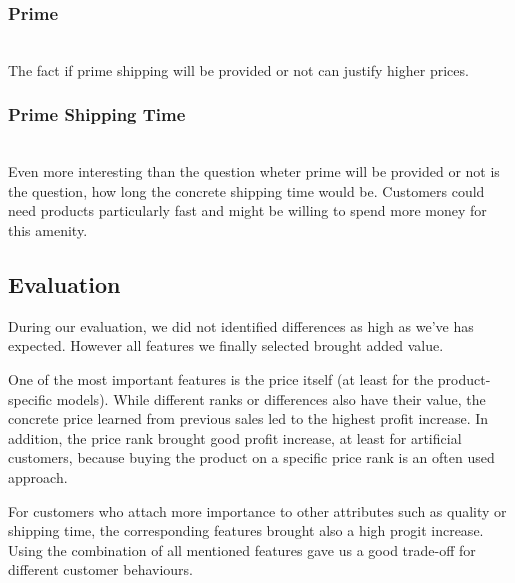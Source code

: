 	\subsubsection{Prime}
		~\\
		The fact if prime shipping will be provided or not can justify higher prices.
	\subsubsection{Prime Shipping Time}
		~\\
		Even more interesting than the question wheter prime will be provided or not is the question, how long the concrete shipping time would be. Customers could need products particularly fast and might be willing to spend more money for this amenity.
\subsection{Evaluation}
	During our evaluation, we did not identified differences as high as we've has expected. However all features we finally selected brought added value.

	One of the most important features is the price itself (at least for the product-specific models). While different ranks or differences also have their value, the concrete price learned from previous sales led to the highest profit increase. In addition, the price rank brought good profit increase, at least for artificial customers, because buying the product on a specific price rank is an often used approach.

	For customers who attach more importance to other attributes such as quality or shipping time, the corresponding features brought also a high progit increase. Using the combination of all mentioned features gave us a good trade-off for different customer behaviours.
